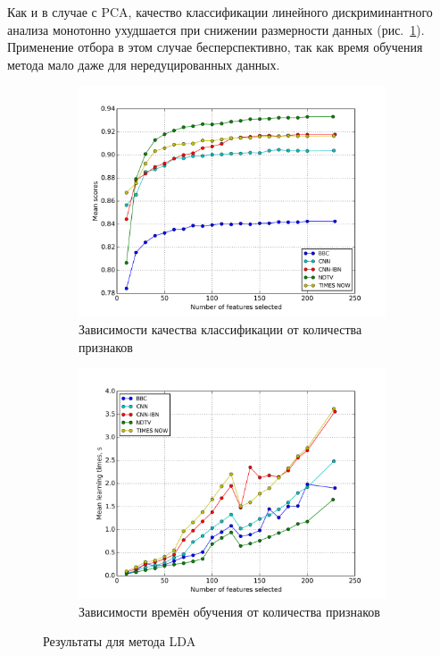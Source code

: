 \par
Как и в случае с PCA, качество классификации линейного дискриминантного анализа монотонно ухудшается при снижении размерности данных (рис.~\ref{fig:lda_rfs}). Применение отбора в этом случае бесперспективно, так как время обучения метода мало даже для нередуцированных данных.

\begin{figure}[h!]
    \centering
	\begin{subfigure}{0.45\textwidth}
		\includegraphics[width=\textwidth]{images/RFS-LDA.png}
		\caption{Зависимости качества классификации от количества признаков}
	\end{subfigure}
	\begin{subfigure}{0.45\textwidth}
		\includegraphics[width=\textwidth]{images/RFS-LDATime.png}
		\caption{Зависимости времён обучения от количества признаков}
	\end{subfigure}
	\caption{Результаты для метода LDA}\label{fig:lda_rfs}
\end{figure}

